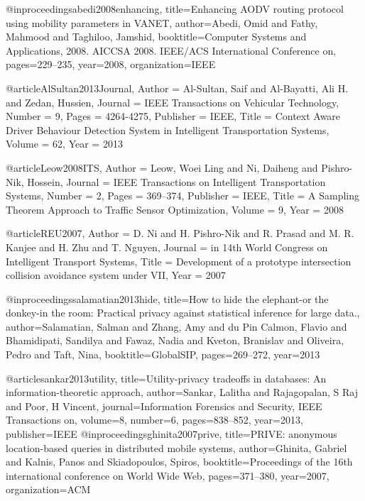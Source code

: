 {{{{{{{{@inproceedings{abedi2008enhancing,
	  title={Enhancing AODV routing protocol using mobility parameters in VANET},
	  author={Abedi, Omid and Fathy, Mahmood and Taghiloo, Jamshid},
	  booktitle={Computer Systems and Applications, 2008. AICCSA 2008. IEEE/ACS International Conference on},
	  pages={229--235},
	  year={2008},
	  organization={IEEE}
	}


@article{AlSultan2013Journal,
	Author = {Al-Sultan, Saif and Al-Bayatti, Ali H. and Zedan, Hussien},
	Journal = {IEEE Transactions on Vehicular Technology},
	Number = {9},
	Pages = {4264-4275},
	Publisher = {IEEE},
	Title = {Context Aware Driver Behaviour Detection System in Intelligent Transportation Systems},
	Volume = {62},
	Year = {2013}}






@article{Leow2008ITS,
	Author = {Leow, Woei Ling and Ni, Daiheng and Pishro-Nik, Hossein},
	Journal = {IEEE Transactions on Intelligent Transportation Systems},
	Number = {2},
	Pages = {369--374},
	Publisher = {IEEE},
	Title = {A Sampling Theorem Approach to Traffic Sensor Optimization},
	Volume = {9},
	Year = {2008}}



@article{REU2007,
	Author = {D. Ni and H. Pishro-Nik and R. Prasad and M. R. Kanjee and H. Zhu and T. Nguyen},
	Journal = {in 14th World Congress on Intelligent Transport Systems},
	Title = {Development of a prototype intersection collision avoidance system under VII},
	Year = {2007}}




@inproceedings{salamatian2013hide,
  title={How to hide the elephant-or the donkey-in the room: Practical privacy against statistical inference for large data.},
  author={Salamatian, Salman and Zhang, Amy and du Pin Calmon, Flavio and Bhamidipati, Sandilya and Fawaz, Nadia and Kveton, Branislav and Oliveira, Pedro and Taft, Nina},
  booktitle={GlobalSIP},
  pages={269--272},
  year={2013}
}

@article{sankar2013utility,
  title={Utility-privacy tradeoffs in databases: An information-theoretic approach},
  author={Sankar, Lalitha and Rajagopalan, S Raj and Poor, H Vincent},
  journal={Information Forensics and Security, IEEE Transactions on},
  volume={8},
  number={6},
  pages={838--852},
  year={2013},
  publisher={IEEE}
}
@inproceedings{ghinita2007prive,
  title={PRIVE: anonymous location-based queries in distributed mobile systems},
  author={Ghinita, Gabriel and Kalnis, Panos and Skiadopoulos, Spiros},
  booktitle={Proceedings of the 16th international conference on World Wide Web},
  pages={371--380},
  year={2007},
  organization={ACM}
}

}}}}}}}}

